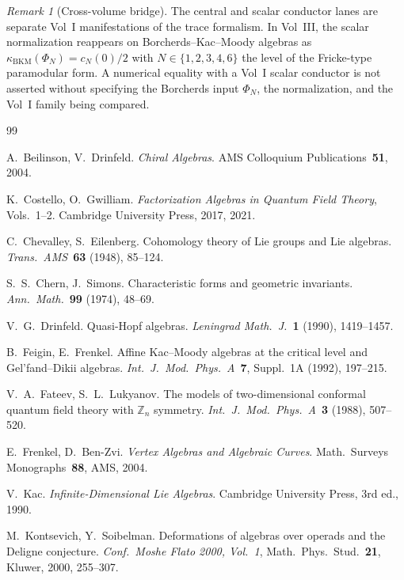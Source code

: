 \documentclass[11pt,reqno]{amsart}
\theoremstyle{definition}
\theoremstyle{remark}
\newtheorem{remark}[theorem]{Remark}
\numberwithin{equation}{section}
\begin{document}
\begin{remark}[Cross-volume bridge]
\label{rem:conductor-cross-volume}
The central and scalar conductor lanes are separate Vol~I
manifestations of the trace formalism. In Vol~III, the scalar
normalization reappears
on Borcherds--Kac--Moody algebras as
$\kappa_{\mathrm{BKM}}(\Phi_N) = c_N(0)/2$ with $N \in \{1,2,3,4,6\}$
the level of the Fricke-type paramodular form. A numerical equality
with a Vol~I scalar conductor is not asserted without specifying the
Borcherds input $\Phi_N$, the normalization, and the Vol~I family
being compared.
\end{remark}


\begin{thebibliography}{99}

A.~Beilinson, V.~Drinfeld.
\emph{Chiral Algebras}.
AMS Colloquium Publications~\textbf{51}, 2004.

K.~Costello, O.~Gwilliam.
\emph{Factorization Algebras in Quantum Field Theory},
Vols.~1--2.
Cambridge University Press, 2017, 2021.

C.~Chevalley, S.~Eilenberg.
Cohomology theory of Lie groups and Lie algebras.
\emph{Trans.~AMS}~\textbf{63} (1948), 85--124.

S.~S.~Chern, J.~Simons.
Characteristic forms and geometric invariants.
\emph{Ann.~Math.}~\textbf{99} (1974), 48--69.

V.~G.~Drinfeld.
Quasi-Hopf algebras.
\emph{Leningrad Math.~J.}~\textbf{1} (1990), 1419--1457.

B.~Feigin, E.~Frenkel.
Affine Kac--Moody algebras at the critical level and
Gel'fand--Dikii algebras.
\emph{Int.~J.~Mod.~Phys.~A}~\textbf{7}, Suppl.~1A (1992),
197--215.

V.~A.~Fateev, S.~L.~Lukyanov.
The models of two-dimensional conformal quantum field theory
with $\mathbb{Z}_n$ symmetry.
\emph{Int.~J.~Mod.~Phys.~A}~\textbf{3} (1988), 507--520.

E.~Frenkel, D.~Ben-Zvi.
\emph{Vertex Algebras and Algebraic Curves}.
Math.~Surveys Monographs~\textbf{88}, AMS, 2004.

V.~Kac.
\emph{Infinite-Dimensional Lie Algebras}.
Cambridge University Press, 3rd ed., 1990.

M.~Kontsevich, Y.~Soibelman.
Deformations of algebras over operads and the Deligne conjecture.
\emph{Conf.~Moshe Flato 2000, Vol.~1},
Math.~Phys.~Stud.~\textbf{21}, Kluwer, 2000, 255--307.


\end{thebibliography}
\end{document}

